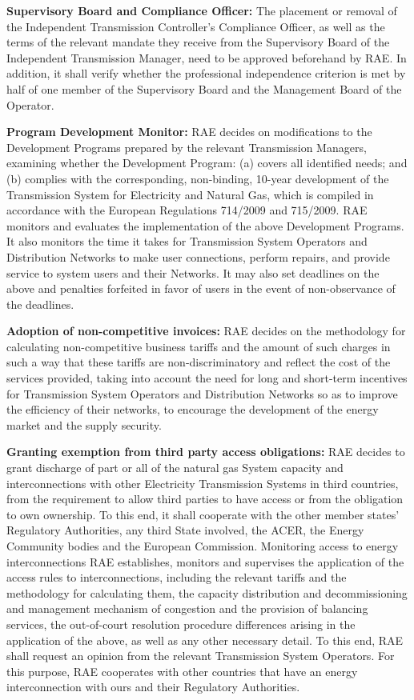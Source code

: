 \begin{itemize}
{\item{\textbf{Supervisory Board and Compliance Officer:}}
The placement or removal of the Independent Transmission Controller's Compliance Officer, as well as the terms of the relevant mandate they receive from the Supervisory Board of the Independent Transmission Manager, need to be approved beforehand by RAE. In addition, it shall verify whether the professional independence criterion is met by half of one member of the Supervisory Board and the Management Board of the Operator.
\item{\textbf{Program Development Monitor:}}
RAE decides on modifications to the Development Programs prepared by the relevant Transmission Managers, examining whether the Development Program: (a) covers all identified needs; and (b) complies with the corresponding, non-binding, 10-year development of the Transmission System for Electricity and Natural Gas, which is compiled in accordance with the European Regulations 714/2009 and 715/2009. RAE monitors and evaluates the implementation of the above Development Programs. It also monitors the time it takes for Transmission System Operators and Distribution Networks to make user connections, perform repairs, and provide service to system users and their Networks. It may also set deadlines on the above and penalties forfeited in favor of users in the event of non-observance of the deadlines.
\item{\textbf{Adoption of non-competitive invoices:}}
RAE decides on the methodology for calculating non-competitive business tariffs and the amount of such charges in such a way that these tariffs are non-discriminatory and reflect the cost of the services provided, taking into account the need for long and short-term incentives for Transmission System Operators and Distribution Networks so as to improve the efficiency of their networks, to encourage the development of the energy market and the supply security.
\item{\textbf{Granting exemption from third party access obligations:}}
RAE decides to grant discharge of part or all of the natural gas System capacity and interconnections with other Electricity Transmission Systems in third countries, from the requirement to allow third parties to have access or from the obligation to own ownership. To this end, it shall cooperate with the other member states’ Regulatory Authorities, any third State involved, the ACER, the Energy Community bodies and the European Commission. Monitoring access to energy interconnections RAE establishes, monitors and supervises the application of the access rules to interconnections, including the relevant tariffs and the methodology for calculating them, the capacity distribution and decommissioning and management mechanism of congestion and the provision of balancing services, the out-of-court resolution procedure differences arising in the application of the above, as well as any other necessary detail. To this end, RAE shall request an opinion from the relevant Transmission System Operators. For this purpose, RAE cooperates with other countries that have an energy interconnection with ours and their Regulatory Authorities.
}
\end{itemize}
